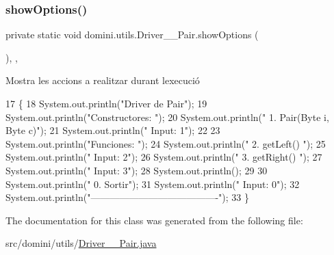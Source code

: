 \mbox{\label{classdomini_1_1utils_1_1Driver____Pair_a97596378f21ba4ab9c0c4ccb4041425b}} 
\subsubsection{\texorpdfstring{show\+Options()}{showOptions()}}
{\footnotesize\ttfamily private static void domini.\+utils.\+Driver\+\_\+\+\_\+\+Pair.\+show\+Options (\begin{DoxyParamCaption}{ }\end{DoxyParamCaption})\hspace{0.3cm}{\ttfamily [inline]}, {\ttfamily [static]}, {\ttfamily [private]}}



Mostra les accions a realitzar durant l\textquotesingle{}execució 


\begin{DoxyCode}
17                                      \{
18         System.out.println(\textcolor{stringliteral}{"Driver de Pair"});
19         System.out.println(\textcolor{stringliteral}{"Constructores: "});
20         System.out.println(\textcolor{stringliteral}{"     1. Pair(Byte i, Byte c)"});
21         System.out.println(\textcolor{stringliteral}{"     Input: 1"});
22 
23         System.out.println(\textcolor{stringliteral}{"Funciones: "});
24         System.out.println(\textcolor{stringliteral}{"     2. getLeft() "});
25         System.out.println(\textcolor{stringliteral}{"     Input: 2"});
26         System.out.println(\textcolor{stringliteral}{"     3. getRight() "});
27         System.out.println(\textcolor{stringliteral}{"     Input: 3"});
28         System.out.println();
29 
30         System.out.println(\textcolor{stringliteral}{"     0. Sortir"});
31         System.out.println(\textcolor{stringliteral}{"     Input: 0"});
32         System.out.println(\textcolor{stringliteral}{"----------------------------------------"});
33     \}
\end{DoxyCode}


The documentation for this class was generated from the following file\+:\begin{DoxyCompactItemize}
\item 
src/domini/utils/\hyperlink{Driver____Pair_8java}{Driver\+\_\+\+\_\+\+Pair.\+java}\end{DoxyCompactItemize}
